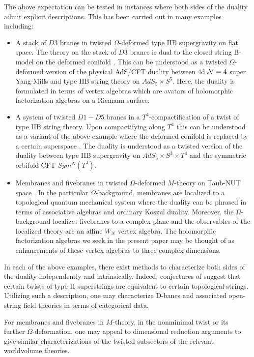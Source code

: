 The above expectation can be tested in instances where both sides of the duality admit explicit descriptions.
This has been carried out in many examples including:
\begin{itemize}
  \item A stack of $D3$ branes in twisted $\Omega$-deformed type IIB supergravity on flat space. The theory on the stack of $D3$ branes is dual to the closed string B-model on the deformed conifold \cite{costello2021twisted}. This can be understood as a twisted $\Omega$-deformed version of the physical AdS/CFT duality between 4d $\mathcal N=4$ super Yang-Mills and type IIB string theory on $AdS_{5}\times S^{5}$. Here, the duality is formulated in terms of vertex algebras which are avatars of holomorphic factorization algebras on a Riemann surface.

  \item A system of twisted $D1-D5$ branes in a $T^{4}$-compactification of a twist of type IIB string theory. Upon compactifying along $T^4$ this can be understood as a variant of the above example where the deformed conifold is replaced by a certain superspace \cite{CP}. The duality is understood as a twisted version of the duality between type IIB supergravity on $AdS_{3}\times S^{3}\times T^{4}$ and the symmetric orbifold CFT $Sym^{N}(T^{4})$.

  \item Membranes and fivebranes in twisted $\Omega$-deformed $M$-theory on Taub-NUT space \cite{CostelloM5,CostelloM2}.
In the particular $\Omega$-background, membranes are localized to a topological quantum mechanical system where the duality can be phrased in terms of associative algebras and ordinary Koszul duality. Moreover, the $\Omega$-background localizes fivebranes to a complex plane and the observables of the localized theory are an affine $W_{N}$ vertex algebra. The holomorphic factorization algebras we seek in the present paper may be thought of as enhancements of these vertex algebras to three-complex dimensions.
\end{itemize}

In each of the above examples, there exist methods to characterize both sides of the duality independently and intrinsically. Indeed, conjectures of \cite{CLsugra} suggest that certain twists of type II superstrings are equivalent to certain topological strings. Utilizing such a description, one may characterize D-banes and associated open-string field theories in terms of categorical data.

For membranes and fivebranes in $M$-theory, in the nonminimal twist or its further $\Omega$-deformation, one may appeal to dimensional reduction arguments to give similar characterizations of the twisted subsectors of the relevant worldvolume theories.

